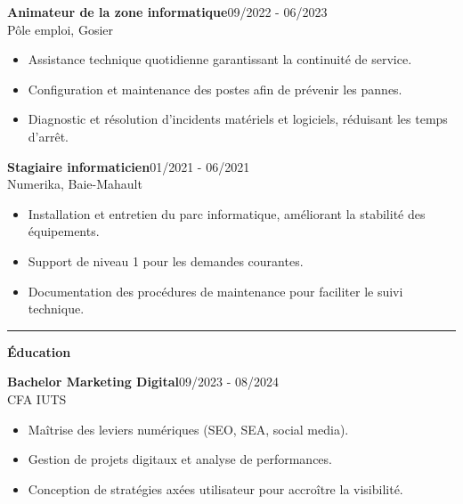 \documentclass[a4paper]{article}
\renewcommand{\colorbox}[2]{#2}%
\newcommand{\fullrule}{\hspace{-1.5cm}\rule{\paperwidth}{0.4pt}}
\newcommand{\cvsection}[1]{%
  \vspace{6pt}\textbf{\Large #1}\par\vspace{2pt}}
\begin{document}
\vspace{3mm}

\colorbox{maincolor}{%
  \begin{minipage}{\linewidth}
    \noindent
    \textbf{Animateur de la zone informatique}\hfill 09/2022 - 06/2023\\
    Pôle emploi, Gosier\\[-0.3em]
    \begin{itemize}[leftmargin=*]
      \item Assistance technique quotidienne garantissant la continuité de service. \item Configuration et maintenance des postes afin de prévenir les pannes. \item Diagnostic et résolution d’incidents matériels et logiciels, réduisant les temps d’arrêt.
    \end{itemize}
  \end{minipage}}

\vspace{3mm}

\colorbox{maincolor}{%
  \begin{minipage}{\linewidth}
    \noindent
    \textbf{Stagiaire informaticien}\hfill 01/2021 - 06/2021\\
    Numerika, Baie-Mahault\\[-0.3em]
    \begin{itemize}[leftmargin=*]
      \item Installation et entretien du parc informatique, améliorant la stabilité des équipements. \item Support de niveau 1 pour les demandes courantes. \item Documentation des procédures de maintenance pour faciliter le suivi technique.
    \end{itemize}
  \end{minipage}}

\medskip\fullrule

\cvsection{Éducation}
\vspace{0.5cm}

\colorbox{maincolor}{%
  \begin{minipage}{\linewidth}
    \noindent
    \textbf{Bachelor Marketing Digital}\hfill 09/2023 - 08/2024\\
    CFA IUTS\\[-0.3em]
    \begin{itemize}[leftmargin=*]
      \item Maîtrise des leviers numériques (SEO, SEA, social media). \item Gestion de projets digitaux et analyse de performances. \item Conception de stratégies axées utilisateur pour accroître la visibilité.
    \end{itemize}
  \end{minipage}}
\end{document}
